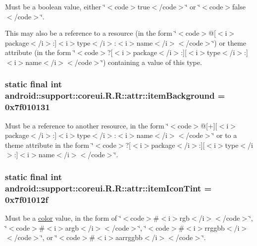 Must be a boolean value, either \char`\"{}$<$code$>$true$<$/code$>$\char`\"{} or \char`\"{}$<$code$>$false$<$/code$>$\char`\"{}. 

This may also be a reference to a resource (in the form \char`\"{}$<$code$>$@\mbox{[}$<$i$>$package$<$/i$>$:\mbox{]}$<$i$>$type$<$/i$>$:$<$i$>$name$<$/i$>$$<$/code$>$\char`\"{}) or theme attribute (in the form \char`\"{}$<$code$>$?\mbox{[}$<$i$>$package$<$/i$>$:\mbox{]}\mbox{[}$<$i$>$type$<$/i$>$:\mbox{]}$<$i$>$name$<$/i$>$$<$/code$>$\char`\"{}) containing a value of this type. \hypertarget{classandroid_1_1support_1_1coreui_1_1_r_1_1attr_2fa455f8d8d7a3aee3cf80c7befe75fc}{
\subsubsection[{itemBackground}]{\setlength{\rightskip}{0pt plus 5cm}static final int android::support::coreui.R.R::attr::itemBackground = 0x7f010131}}
\label{classandroid_1_1support_1_1coreui_1_1_r_1_1attr_2fa455f8d8d7a3aee3cf80c7befe75fc}


Must be a reference to another resource, in the form \char`\"{}$<$code$>$@\mbox{[}+\mbox{]}\mbox{[}$<$i$>$package$<$/i$>$:\mbox{]}$<$i$>$type$<$/i$>$:$<$i$>$name$<$/i$>$$<$/code$>$\char`\"{} or to a theme attribute in the form \char`\"{}$<$code$>$?\mbox{[}$<$i$>$package$<$/i$>$:\mbox{]}\mbox{[}$<$i$>$type$<$/i$>$:\mbox{]}$<$i$>$name$<$/i$>$$<$/code$>$\char`\"{}. \hypertarget{classandroid_1_1support_1_1coreui_1_1_r_1_1attr_e34cf52665e7c9b402400b768e0a2413}{
\subsubsection[{itemIconTint}]{\setlength{\rightskip}{0pt plus 5cm}static final int android::support::coreui.R.R::attr::itemIconTint = 0x7f01012f}}
\label{classandroid_1_1support_1_1coreui_1_1_r_1_1attr_e34cf52665e7c9b402400b768e0a2413}


Must be a \hyperlink{classandroid_1_1support_1_1coreui_1_1_r_1_1color}{color} value, in the form of \char`\"{}$<$code$>$\#$<$i$>$rgb$<$/i$>$$<$/code$>$\char`\"{}, \char`\"{}$<$code$>$\#$<$i$>$argb$<$/i$>$$<$/code$>$\char`\"{}, \char`\"{}$<$code$>$\#$<$i$>$rrggbb$<$/i$>$$<$/code$>$\char`\"{}, or \char`\"{}$<$code$>$\#$<$i$>$aarrggbb$<$/i$>$$<$/code$>$\char`\"{}. 

